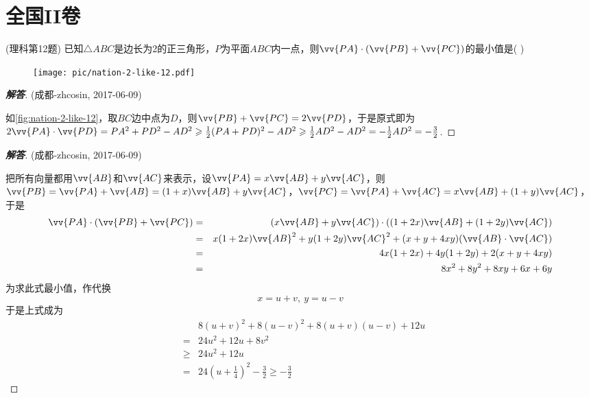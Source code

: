 \documentclass{ctexart}
\begin{document}
\section{全国II卷}
\label{sec:nation-2}

\begin{exercise}(理科第12题)
  已知$\triangle ABC$是边长为2的正三角形，$P$为平面$ABC$内一点，则$\vv{PA} \cdot (\vv{PB}+\vv{PC})$的最小值是(    )

\end{exercise}

\begin{figure}[htbp]
  \centering
\texttt{[image: pic/nation-2-like-12.pdf]}
\caption{}
\label{fig:nation-2-like-12}
\end{figure}

\begin{proof}[\textbf{解答}](成都-zhcosin, 2017-06-09)

  如\autoref{fig:nation-2-like-12}，取$BC$边中点为$D$，则$\vv{PB}+\vv{PC}=2\vv{PD}$，于是原式即为$2\vv{PA}\cdot \vv{PD}=PA^2+PD^2-AD^2 \geqslant \frac{1}{2}(PA+PD)^2 - AD^2 \geqslant \frac{1}{2}AD^2 -  AD^2 = - \frac{1}{2} AD^2 = -\frac{3}{2}$.
\end{proof}

\begin{proof}[\textbf{解答}](成都-zhcosin, 2017-06-09)

  把所有向量都用$\vv{AB}$和$\vv{AC}$来表示，设$\vv{PA}=x\vv{AB}+y\vv{AC}$，则$\vv{PB}=\vv{PA}+\vv{AB}=(1+x)\vv{AB}+y\vv{AC}$，$\vv{PC}=\vv{PA}+\vv{AC}=x\vv{AB}+(1+y)\vv{AC}$，于是
  \begin{eqnarray*}
    \vv{PA} \cdot (\vv{PB}+\vv{PC}) & = & (x\vv{AB}+y\vv{AC}) \cdot ((1+2x)\vv{AB}+(1+2y)\vv{AC}) \\
                                    & = & x(1+2x)\vv{AB}^2+y(1+2y)\vv{AC}^2+(x+y+4xy)(\vv{AB} \cdot \vv{AC}) \\
                                    & = & 4x(1+2x)+4y(1+2y)+2(x+y+4xy) \\
    & = & 8x^2+8y^2+8xy+6x+6y
  \end{eqnarray*}
  为求此式最小值，作代换
  \[ x=u+v, \  y=u-v \]
  于是上式成为
  \begin{eqnarray*}
    & & 8(u+v)^2+8(u-v)^2+8(u+v)(u-v)+12u \\
    & = & 24u^2+12u+8v^2 \\
    & \geqslant & 24u^2+12u \\
    & = & 24 \left( u+\frac{1}{4} \right)^2-\frac{3}{2} \geqslant -\frac{3}{2}
  \end{eqnarray*}
\end{proof}
\end{document}
